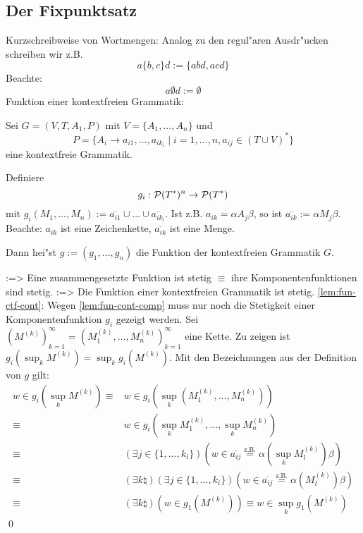 \subsection{Der Fixpunktsatz}
\remark Kurzschreibweise von Wortmengen:{
  Analog zu den regul"aren Ausdr"ucken schreiben wir z.B.
  \[a\{b,c\}d:=\{abd,acd\}
    \]
  Beachte:
  \[a\emptyset d:=\emptyset
    \]
  }
 Funktion einer kontextfreien Grammatik:{
  Sei $G=(V,T,A_1,P)$ mit $V=\{A_1,\ldots,A_n\}$ und
  \[P=\{A_i\to a_{i1},\ldots,a_{ik_i}\mid i=1,\ldots,n, a_{ij}\in (T\cup V)^*\}
    \]
  eine kontextfreie Grammatik.
  
  Definiere
  \[g_i:\cal P(T^*)^n\to\cal P(T^*)
    \]
  mit $g_i(M_1,\ldots,M_n):=\overline{a_{i1}}\cup\ldots\cup\overline{a_{ik_i}}$.
  Ist z.B. $a_{ik}=\alpha A_j\beta$, so ist $\overline{a_{ik}}:=\alpha M_j \beta$.
  Beachte: $a_{ik}$ ist eine Zeichenkette, $\overline{a_{ik}}$ ist eine Menge.
  
  Dann hei"st $g:=(g_1,\ldots,g_n)$ die Funktion der kontextfreien 
  Grammatik $G$.
  }
\lemma:=>{
  \label{lem:fun-cont-comp}
  Eine zusammengesetzte Funktion ist stetig $\equiv$ ihre 
  Komponentenfunktionen sind stetig.
  }
\lemma:=>{
  \label{lem:fun-ctf-cont}
  Die Funktion einer kontextfreien Grammatik ist stetig.
  }
\proof \ref{lem:fun-ctf-cont}:{
  Wegen \ref{lem:fun-cont-comp} muss nur noch die Stetigkeit einer
  Komponentenfunktion $g_i$ gezeigt werden. 
  Sei $(M^{(k)})_{k=1}^\infty=(M_1^{(k)},\ldots,M_n^{(k)})_{k=1}^\infty$ eine 
  Kette.
  Zu zeigen ist $g_i(\sup_k M^{(k)})=\sup_k g_i(M^{(k)})$.
  Mit den Bezeichnungen aus der Definition von $g$ gilt:
  \begin{align*}
    w\in g_i(\sup_k M^{(k)})
    \equiv &w\in g_i(\sup_k(M_1^{(k)},\ldots,M_n^{(k)}))\\
    \equiv &w\in g_i(\sup_k M_1^{(k)},\ldots,\sup_k M_n^{(k)})\\
    \equiv &(\exists j\in\{1,\ldots,k_i\})(w\in\overline{a_{ij}}
      \overset{\text{z.B.}}= \alpha(\sup_k M^{(k)}_l)\beta) \\
    \equiv &(\exists k\natural)(\exists j\in\{1,\ldots,k_i\})(w\in\overline{a_{ij}}
      \overset{\text{z.B.}}= \alpha(M^{(k)}_l)\beta)\\
    \equiv &(\exists k\natural)(w\in g_1(M^{(k)}))
    \equiv w\in \sup_k g_1(M^{(k)})
    \end{align*}
  \qed
  }
